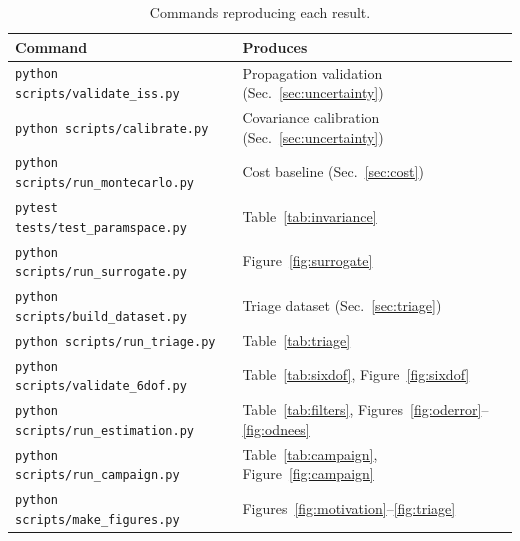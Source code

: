 \documentclass[11pt]{article}
\begin{document}
\begin{table}[htbp]
\centering
\caption{Commands reproducing each result.}
\label{tab:repro}
\begin{tabular}{ll}
\toprule
Command & Produces \\
\midrule
\texttt{python scripts/validate\_iss.py}   & Propagation validation (Sec.~\ref{sec:uncertainty}) \\
\texttt{python scripts/calibrate.py}       & Covariance calibration (Sec.~\ref{sec:uncertainty}) \\
\texttt{python scripts/run\_montecarlo.py} & Cost baseline (Sec.~\ref{sec:cost}) \\
\texttt{pytest tests/test\_paramspace.py}  & Table~\ref{tab:invariance} \\
\texttt{python scripts/run\_surrogate.py}  & Figure~\ref{fig:surrogate} \\
\texttt{python scripts/build\_dataset.py}  & Triage dataset (Sec.~\ref{sec:triage}) \\
\texttt{python scripts/run\_triage.py}     & Table~\ref{tab:triage} \\
\texttt{python scripts/validate\_6dof.py}  & Table~\ref{tab:sixdof}, Figure~\ref{fig:sixdof} \\
\texttt{python scripts/run\_estimation.py} & Table~\ref{tab:filters}, Figures~\ref{fig:oderror}--\ref{fig:odnees} \\
\texttt{python scripts/run\_campaign.py}   & Table~\ref{tab:campaign}, Figure~\ref{fig:campaign} \\
\texttt{python scripts/make\_figures.py}   & Figures~\ref{fig:motivation}--\ref{fig:triage} \\
\bottomrule
\end{tabular}
\end{table}
\end{document}
